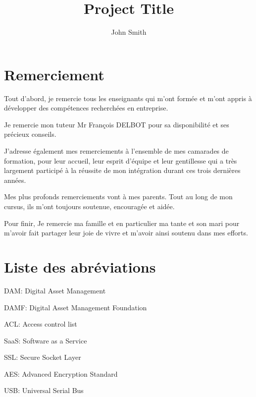 \documentclass[a4paper, 12pt]{report}
\title{Project Title}
\author{John Smith}
\begin{document}



\chapter*{Remerciement}

Tout d’abord, je remercie tous les enseignants qui m'ont formée et m'ont appris à développer des compétences recherchées en entreprise.
\newline

Je remercie mon tuteur Mr François DELBOT pour sa 
disponibilité et ses précieux conseils.
\newline

J'adresse également mes remerciements à l’ensemble de mes camarades de formation, pour leur accueil, leur esprit d'équipe et leur gentillesse qui a très largement participé à la réussite de mon intégration durant ces trois dernières années.
\newline

Mes plus profonds remerciements vont à mes parents. Tout au long de mon cursus, ils m’ont toujours soutenue, encouragée et aidée. 
\newline

Pour finir, Je remercie ma famille et en particulier ma tante et son mari pour m’avoir fait partager leur joie de vivre et m’avoir ainsi soutenu dans mes efforts.

\chapter*{Liste des abréviations}{}

DAM: Digital Asset Management
\newline

DAMF: Digital Asset Management Foundation
\newline

ACL: Access control list
\newline

SaaS: Software as a Service
\newline

SSL: Secure Socket Layer
\newline

AES: Advanced Encryption Standard
\newline

USB: Universal Serial Bus
\newline
\end{document}
